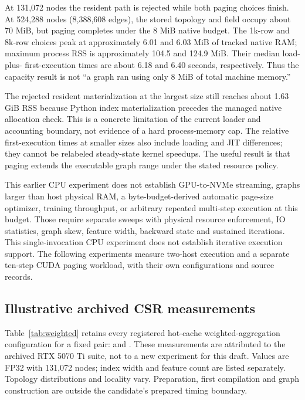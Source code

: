 At 131,072 nodes the resident path is rejected while both paging choices finish.
At 524,288 nodes (8,388,608 edges), the stored topology and field occupy about
70 MiB, but paging completes under the 8 MiB native budget. The 1k-row and
8k-row choices peak at approximately 6.01 and 6.03 MiB of tracked native RAM;
maximum process RSS is approximately 104.5 and 124.9 MiB. Their median load-plus-
first-execution times are about 6.18 and 6.40 seconds, respectively. Thus the
capacity result is not ``a graph ran using only 8 MiB of total machine memory.''

The rejected resident materialization at the largest size still reaches about
1.63 GiB RSS because Python index materialization precedes the managed native
allocation check. This is a concrete limitation of the current loader and
accounting boundary, not evidence of a hard process-memory cap. The relative
first-execution times at smaller sizes also include loading and JIT differences;
they cannot be relabeled steady-state kernel speedups. The useful result is that
paging extends the executable graph range under the stated resource policy.

This earlier CPU experiment does not establish GPU-to-NVMe streaming, graphs larger
than host physical RAM, a byte-budget-derived automatic page-size optimizer,
training throughput, or arbitrary repeated multi-step execution at this budget.
Those require separate sweeps with physical resource enforcement, IO statistics,
graph skew, feature width, backward state and sustained iterations. This
single-invocation CPU experiment does not establish iterative execution support.
The following experiments measure two-host execution and a separate ten-step
CUDA paging workload, with their own configurations and source records.
\FloatBarrier



\subsection{Illustrative archived CSR measurements}
Table~\ref{tab:weighted} retains every registered hot-cache weighted-aggregation
configuration for a fixed pair:  and
. These measurements are attributed to the archived RTX
5070 Ti suite, not to a new experiment for this draft. Values are FP32 with
131,072 nodes; index width and feature count are listed separately. Topology
distributions and locality vary. Preparation, first compilation and graph
construction are outside the candidate's prepared timing boundary.

